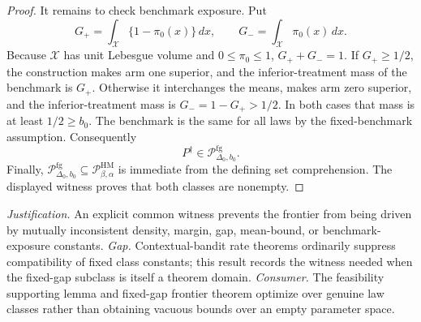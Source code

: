 \documentclass{article}
\begin{document}
\begin{proof}
It remains to check benchmark exposure.  Put
\[
G_+=\int_{\mathcal X}\{1-\pi_0(x)\}\,dx,
\qquad
G_-=\int_{\mathcal X}\pi_0(x)\,dx.
\]
Because \(\mathcal X\) has unit Lebesgue volume and \(0\leq\pi_0\leq1\), \(G_++G_-=1\).  If \(G_+\geq1/2\), the construction makes arm one superior, and the inferior-treatment mass of the benchmark is \(G_+\).  Otherwise it interchanges the means, makes arm zero superior, and the inferior-treatment mass is \(G_-=1-G_+>1/2\).  In both cases that mass is at least \(1/2\geq b_0\).  The benchmark is the same for all laws by the fixed-benchmark assumption.  Consequently
\[
P^\dagger\in\mathcal P_{\Delta_0,b_0}^{\mathrm{fg}}.
\]
Finally, \(\mathcal P_{\Delta_0,b_0}^{\mathrm{fg}}\subseteq\mathcal P_{\beta,\alpha}^{\mathrm{HM}}\) is immediate from the defining set comprehension.  The displayed witness proves that both classes are nonempty.
\end{proof}
\par\smallskip\noindent \textit{Justification.} An explicit common witness prevents the frontier from being driven by mutually inconsistent density, margin, gap, mean-bound, or benchmark-exposure constants. \textit{Gap.} Contextual-bandit rate theorems ordinarily suppress compatibility of fixed class constants; this result records the witness needed when the fixed-gap subclass is itself a theorem domain. \textit{Consumer.} The feasibility supporting lemma and fixed-gap frontier theorem optimize over genuine law classes rather than obtaining vacuous bounds over an empty parameter space.
\end{document}
